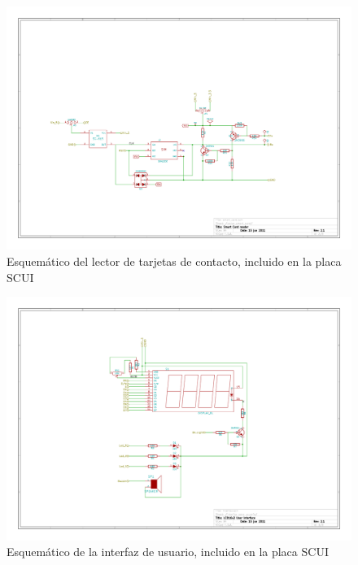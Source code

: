 \begin{figure}[H]
\centering
  \begin{center}
   \includegraphics[angle=90]{Imagenes/scui-lector_smart_card.jpg}
  \end{center}
  \caption{Esquemático del lector de tarjetas de contacto, incluido en la placa SCUI}\label{Fig:SAM} 
\end{figure}
\begin{figure}[H]
\centering
  \begin{center}
   \includegraphics[angle=90]{Imagenes/scui-interfaz_para_usuario.jpg}
  \end{center}
  \caption{Esquemático de la interfaz de usuario, incluido en la placa SCUI}\label{Fig:UI} 
\end{figure}



